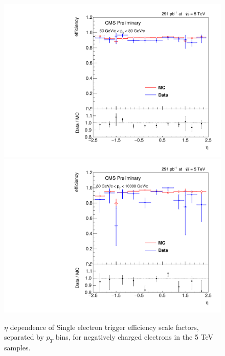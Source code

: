 \begin{figure}
\includegraphics[width=0.45\linewidth]{plots/efficiency/5_zeehlt_negative/PtBins_eta_pt10.pdf}
\includegraphics[width=0.45\linewidth]{plots/efficiency/5_zeehlt_negative/PtBins_eta_pt11.pdf}
\caption{$\eta$ dependence of Single electron trigger efficiency scale factors, separated by $p_T$ bins, for negatively charged electrons in the 5 TeV samples.}
\label{fig:Eff:el:5:HLT:neg}
\end{figure}

